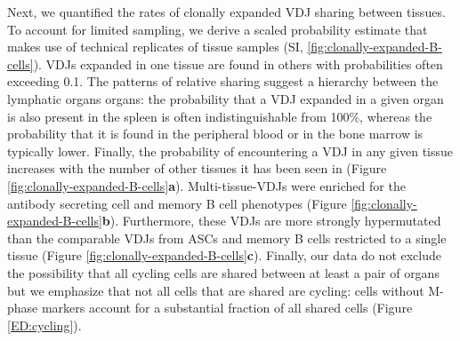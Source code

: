 Next, we quantified the rates of clonally expanded VDJ sharing between tissues. To account for limited sampling, we derive a scaled probability estimate that makes use of technical replicates of tissue samples (SI, \ref{fig:clonally-expanded-B-cells}). VDJs expanded in one tissue are found in others with probabilities often exceeding 0.1. The patterns of relative sharing suggest a hierarchy between the lymphatic organs organs: the probability that a VDJ expanded in a given organ is also present in the spleen is often indistinguishable from 100\%, whereas the probability that it is found in the peripheral blood or in the bone marrow is typically lower. Finally, the probability of encountering a VDJ in any given tissue increases with the number of other tissues it has been seen in (Figure \ref{fig:clonally-expanded-B-cells}\textbf{a}). Multi-tissue-VDJs were enriched for the antibody secreting cell and memory B cell phenotypes  (Figure \ref{fig:clonally-expanded-B-cells}\textbf{b}). Furthermore, these VDJs are more strongly hypermutated than the comparable VDJs from ASCs and memory B cells restricted to a single tissue (Figure \ref{fig:clonally-expanded-B-cells}\textbf{c}). Finally, our data do not exclude the possibility that all cycling cells are shared between at least a pair of organs but we emphasize that not all cells that are shared are cycling: cells without M-phase markers account for a substantial fraction of all shared cells (Figure \ref{ED:cycling}).


